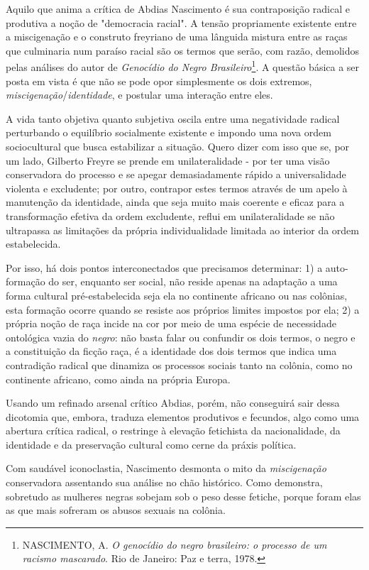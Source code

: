 Aquilo que anima a crítica de Abdias Nascimento é sua contraposição
radical e produtiva a noção de "democracia racial". A tensão
propriamente existente entre a miscigenação e o construto freyriano de
uma lânguida mistura entre as raças que culminaria num paraíso racial
são os termos que serão, com razão, demolidos pelas análises do autor de
\emph{Genocídio do Negro Brasileiro}\footnote{NASCIMENTO, A. \emph{O
  genocídio do negro brasileiro: o processo de um racismo mascarado}.
  Rio de Janeiro: Paz e terra, 1978.}. A questão básica a ser posta em
vista é que não se pode opor simplesmente os dois extremos,
\emph{miscigenação}/\emph{identidade}, e postular uma interação entre
eles.

A vida tanto objetiva quanto subjetiva oscila entre uma negatividade
radical perturbando o equilíbrio socialmente existente e impondo uma
nova ordem sociocultural que busca estabilizar a situação. Quero dizer
com isso que se, por um lado, Gilberto Freyre se prende em
unilateralidade - por ter uma visão conservadora do processo e se apegar
demasiadamente rápido a universalidade violenta e excludente; por outro,
contrapor estes termos através de um apelo à manutenção da identidade,
ainda que seja muito mais coerente e eficaz para a transformação efetiva
da ordem excludente, reflui em unilateralidade se não ultrapassa as
limitações da própria individualidade limitada ao interior da ordem
estabelecida.

Por isso, há dois pontos interconectados que precisamos determinar: 1) a
auto-formação do ser, enquanto ser social, não reside apenas na
adaptação a uma forma cultural pré-estabelecida seja ela no continente
africano ou nas colônias, esta formação ocorre quando se resiste aos
próprios limites impostos por ela; 2) a própria noção de raça incide na
cor por meio de uma espécie de necessidade ontológica vazia do
\emph{negro}: não basta falar ou confundir os dois termos, o negro e a
constituição da ficção raça, é a identidade dos dois termos que indica
uma contradição radical que dinamiza os processos sociais tanto na
colônia, como no continente africano, como ainda na própria Europa.

Usando um refinado arsenal crítico Abdias, porém, não conseguirá sair
dessa dicotomia que, embora, traduza elementos produtivos e fecundos,
algo como uma abertura crítica radical, o restringe à elevação
fetichista da nacionalidade, da identidade e da preservação cultural
como cerne da práxis política.

Com saudável iconoclastia, Nascimento desmonta o mito da
\emph{miscigenação} conservadora assentando sua análise no chão
histórico. Como demonstra, sobretudo as mulheres negras sobejam sob o
peso desse fetiche, porque foram elas as que mais sofreram os abusos
sexuais na colônia.

